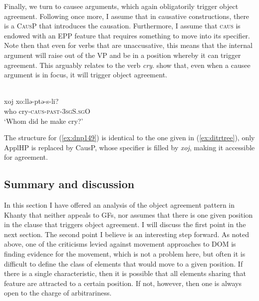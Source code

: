 \documentclass[output=paper
,modfonts
,nonflat]{langsci/langscibook}
\begin{document}
\noindent Finally, we turn to causee arguments, which again obligatorily trigger object agreement.
Following \citet{pylkkanen2008} once more, I assume that in causative constructions, there is a \textsc{CausP} that introduces the causation.
Furthermore, I assume that \textsc{caus} is endowed with an EPP feature that requires something to move into its specifier. Note then that even for verbs that are unaccusative, this means that the internal argument will raise out of the VP and be in a position whereby it can trigger agreement. This arguably relates to the verb \textit{cry}. \citeauthor{dn2011} show that, even when a causee argument is in focus, it will trigger object agreement. 

\begin{exe}
\ex \citet[][149]{dn2011} \label{ex:dnp149}\\
{\gll xoj xo:llə-ptə-s-li?\\
who cry-\textsc{caus-past-3sgS.sgO}\\
\glt `Whom did he make cry?'}
\end{exe}

\noindent The structure for (\ref{ex:dnp149}) is identical to the one given in (\ref{ex:ditrtree}), only ApplHP is replaced by CausP, whose specifier is filled by \textit{xoj}, making it accessible for agreement.

\subsection{Summary and discussion}

In this section I have offered an analysis of the object agreement pattern in Khanty that neither appeals to GFs, nor assumes that there is one given position in the clause that triggers object agreement. 
I will discuss the first point in the next section.
The second point I believe is an interesting step forward. 
As noted above, one of the criticisms levied against movement approaches to DOM is finding evidence for the movement, which is not a problem here, but often it is difficult to define the class of elements that would move to a given position. 
If there is a single characteristic, then it is possible that all elements sharing that feature are attracted to a certain position.
If not, however, then one is always open to the charge of arbitrariness.
\end{document}
